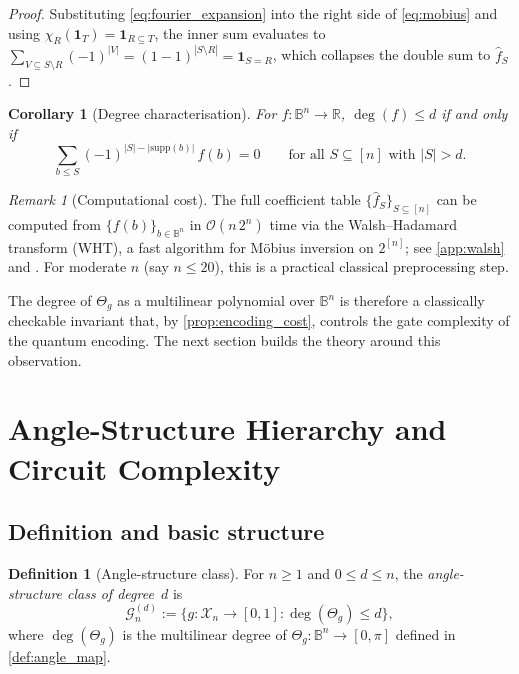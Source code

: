 \documentclass[12pt,a4paper]{article}
\theoremstyle{plain}
\newtheorem{corollary}[corollary]{Corollary}
\theoremstyle{definition}
\newtheorem{definition}[definition]{Definition}
\theoremstyle{remark}
\newtheorem{remark}[remark]{Remark}
\newcommand{\R}{\mathbb{R}}
\newcommand{\Gclass}[2]{\mathcal{G}_{#1}^{(#2)}}
\newcommand{\Thetag}{\Theta_g}
\newcommand{\Iver}[1]{\mathbf{1}_{#1}}
\newcommand{\chimon}[1]{\chi_{#1}}
\newcommand{\indvec}[1]{\mathbf{1}_{#1}}
\begin{document}
\begin{proof}
Substituting \eqref{eq:fourier_expansion} into the right side of
\eqref{eq:mobius} and using $\chimon{R}(\indvec{T}) = \Iver{R\subseteq T}$,
the inner sum evaluates to $\sum_{V\subseteq S\setminus R}(-1)^{|V|}
= (1-1)^{|S\setminus R|} = \Iver{S=R}$, which collapses the double
sum to $\hat{f}_S$.
\end{proof}

\begin{corollary}[Degree characterisation]
\label{cor:degree}
For $f:\mathbb{B}^n\to\R$, $\deg(f)\leq d$ if and only if
\begin{equation}
  \sum_{b\leq S}(-1)^{|S|-|\mathrm{supp}(b)|}\,f(b) = 0
  \qquad\text{for all }S\subseteq[n]\text{ with }|S|>d.
  \label{eq:degree_condition}
\end{equation}
\end{corollary}

\begin{remark}[Computational cost]
\label{rem:wht}
The full coefficient table $\{\hat{f}_S\}_{S\subseteq[n]}$ can be
computed from $\{f(b)\}_{b\in\mathbb{B}^n}$ in $\mathcal{O}(n\,2^n)$
time via the Walsh--Hadamard transform (WHT), a fast algorithm for
Möbius inversion on $2^{[n]}$; see \cref{app:walsh} and
\cite{O'Donnell2014}.
For moderate $n$ (say $n\leq 20$), this is a practical classical
preprocessing step.
\end{remark}

The degree of $\Thetag$ as a multilinear polynomial over $\mathbb{B}^n$
is therefore a classically checkable invariant that, by
\cref{prop:encoding_cost}, controls the gate complexity of the quantum
encoding.
The next section builds the theory around this observation.

\section{Angle-Structure Hierarchy and Circuit Complexity}
\label{sec:hierarchy}

\subsection{Definition and basic structure}

\begin{definition}[Angle-structure class]
\label{def:Gnd}
For $n\geq 1$ and $0\leq d\leq n$, the \emph{angle-structure class of
degree~$d$} is
\begin{equation}
  \Gclass{n}{d} :=
  \bigl\{g:\mathcal{X}_n\to[0,1] : \deg(\Thetag)\leq d\bigr\},
  \label{eq:Gnd_def}
\end{equation}
where $\deg(\Thetag)$ is the multilinear degree of
$\Thetag:\mathbb{B}^n\to[0,\pi]$ defined in \cref{def:angle_map}.
\end{definition}
\end{document}
